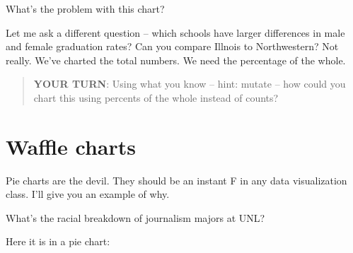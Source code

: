 \documentclass[]{book}
\newenvironment{Shaded}{\begin{snugshade}}{\end{snugshade}}
\newcommand{\DataTypeTok}[1]{\textcolor[rgb]{0.13,0.29,0.53}{#1}}
\newcommand{\DecValTok}[1]{\textcolor[rgb]{0.00,0.00,0.81}{#1}}
\newcommand{\KeywordTok}[1]{\textcolor[rgb]{0.13,0.29,0.53}{\textbf{#1}}}
\newcommand{\NormalTok}[1]{#1}
\newcommand{\OperatorTok}[1]{\textcolor[rgb]{0.81,0.36,0.00}{\textbf{#1}}}
\newcommand{\StringTok}[1]{\textcolor[rgb]{0.31,0.60,0.02}{#1}}
\begin{document}
What's the problem with this chart?

Let me ask a different question -- which schools have larger differences in male and female graduation rates? Can you compare Illnois to Northwestern? Not really. We've charted the total numbers. We need the percentage of the whole.

\begin{quote}
\textbf{YOUR TURN}: Using what you know -- hint: mutate -- how could you chart this using percents of the whole instead of counts?
\end{quote}

\hypertarget{waffle-charts}{%
\chapter{Waffle charts}\label{waffle-charts}}

Pie charts are the devil. They should be an instant F in any data visualization class. I'll give you an example of why.

What's the racial breakdown of journalism majors at UNL?

Here it is in a pie chart:

\begin{Shaded}
\end{Shaded}
\end{document}
